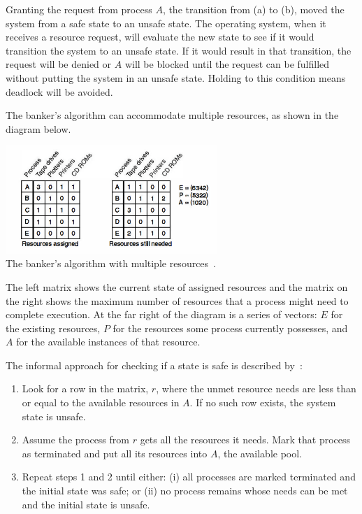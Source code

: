 Granting the request from process $A$, the transition from (a) to (b), moved the system from a safe state to an unsafe state. The operating system, when it receives a resource request, will evaluate the new state to see if it would transition the system to an unsafe state. If it would result in that transition, the request will be denied or $A$ will be blocked until the request can be fulfilled without putting the system in an unsafe state. Holding to this condition means deadlock will be avoided.

The banker's algorithm can accommodate multiple resources, as shown in the diagram below.

\begin{center}
\includegraphics[width=0.6\textwidth]{images/bankers-multiple.png}\\
The banker's algorithm with multiple resources~\cite{mos}.
\end{center}

The left matrix shows the current state of assigned resources and the matrix on the right shows the maximum number of resources that a process might need to complete execution. At the far right of the diagram is a series of vectors: $E$ for the existing resources, $P$ for the resources some process currently possesses, and $A$ for the available instances of that resource.

The informal approach for checking if a state is safe is described by~\cite{mos}:
\begin{enumerate}
	\item Look for a row in the matrix, $r$, where the unmet resource needs are less than or equal to the available resources in $A$. If no such row exists, the system state is unsafe.
	\item Assume the process from $r$ gets all the resources it needs. Mark that process as terminated and put all its resources into $A$, the available pool.
	\item Repeat steps 1 and 2 until either: (i) all processes are marked terminated and the initial state was safe; or (ii) no process remains whose needs can be met and the initial state is unsafe.
\end{enumerate}

